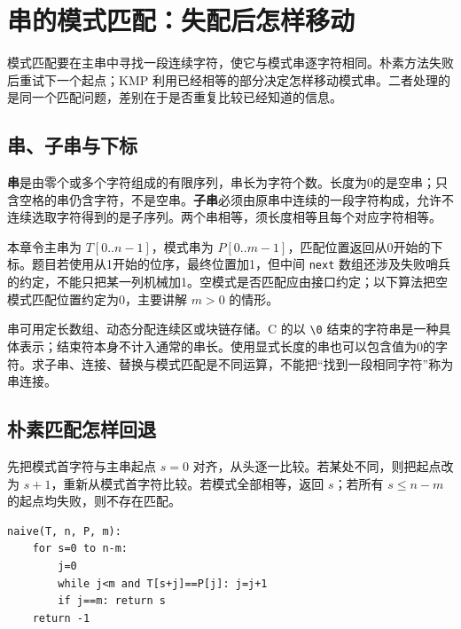 \chapter{串的模式匹配：失配后怎样移动}\label{ds-ch4}

模式匹配要在主串中寻找一段连续字符，使它与模式串逐字符相同。朴素方法失败后重试下一个起点；KMP 利用已经相等的部分决定怎样移动模式串。二者处理的是同一个匹配问题，差别在于是否重复比较已经知道的信息。

\section{串、子串与下标}\label{ds-04-01}

\textbf{串}是由零个或多个字符组成的有限序列，串长为字符个数。长度为0的是空串；只含空格的串仍含字符，不是空串。\textbf{子串}必须由原串中连续的一段字符构成，允许不连续选取字符得到的是子序列。两个串相等，须长度相等且每个对应字符相等。

本章令主串为 \(T[0..n-1]\)，模式串为 \(P[0..m-1]\)，匹配位置返回从0开始的下标。题目若使用从1开始的位序，最终位置加1，但中间 \texttt{next} 数组还涉及失败哨兵的约定，不能只把某一列机械加1。空模式是否匹配应由接口约定；以下算法把空模式匹配位置约定为0，主要讲解 \(m>0\) 的情形。

串可用定长数组、动态分配连续区或块链存储。C 的以 \texttt{\textbackslash{}0} 结束的字符串是一种具体表示；结束符本身不计入通常的串长。使用显式长度的串也可以包含值为0的字符。求子串、连接、替换与模式匹配是不同运算，不能把``找到一段相同字符''称为串连接。

\section{朴素匹配怎样回退}\label{ds-04-02}

先把模式首字符与主串起点 \(s=0\) 对齐，从头逐一比较。若某处不同，则把起点改为 \(s+1\)，重新从模式首字符比较。若模式全部相等，返回 \(s\)；若所有 \(s\le n-m\) 的起点均失败，则不存在匹配。

\par\medskip\noindent
\begin{minipage}{\linewidth}
\begin{verbatim}
naive(T, n, P, m):
    for s=0 to n-m:
        j=0
        while j<m and T[s+j]==P[j]: j=j+1
        if j==m: return s
    return -1
\end{verbatim}
\end{minipage}\par\medskip

